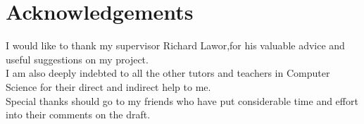 \section*{Acknowledgements}
I would like to thank my supervisor Richard Lawor,for his valuable advice and useful suggestions on my project.\\
I am also deeply indebted to all the other tutors and teachers in Computer Science for their direct and indirect help to me.\\
Special thanks should go to my friends who have put considerable time and effort into their comments on the draft. 